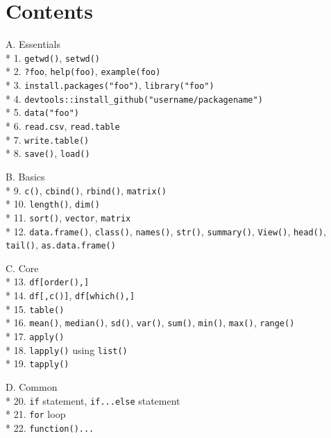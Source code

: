 \documentclass[]{book}
\begin{document}
\hypertarget{contents}{%
\section{Contents}\label{contents}}

A. Essentials\\
* 1. \texttt{getwd()}, \texttt{setwd()}\\
* 2. \texttt{?foo}, \texttt{help(foo)}, \texttt{example(foo)}\\
* 3. \texttt{install.packages("foo")}, \texttt{library("foo")}\\
* 4. \texttt{devtools::install\_github("username/packagename")}\\
* 5. \texttt{data("foo")}\\
* 6. \texttt{read.csv}, \texttt{read.table}\\
* 7. \texttt{write.table()}\\
* 8. \texttt{save()}, \texttt{load()}

B. Basics\\
* 9. \texttt{c()}, \texttt{cbind()}, \texttt{rbind()}, \texttt{matrix()}\\
* 10. \texttt{length()}, \texttt{dim()}\\
* 11. \texttt{sort()}, \texttt{\textquotesingle{}vector\textquotesingle{}{[}{]}}, \texttt{\textquotesingle{}matrix\textquotesingle{}{[}{]}}\\
* 12. \texttt{data.frame()}, \texttt{class()}, \texttt{names()}, \texttt{str()}, \texttt{summary()}, \texttt{View()}, \texttt{head()}, \texttt{tail()}, \texttt{as.data.frame()}

C. Core\\
* 13. \texttt{df{[}order(),{]}}\\
* 14. \texttt{df{[},c(){]}}, \texttt{df{[}which(),{]}}\\
* 15. \texttt{table()}\\
* 16. \texttt{mean()}, \texttt{median()}, \texttt{sd()}, \texttt{var()}, \texttt{sum()}, \texttt{min()}, \texttt{max()}, \texttt{range()}\\
* 17. \texttt{apply()}\\
* 18. \texttt{lapply()} using \texttt{list()}\\
* 19. \texttt{tapply()}

D. Common\\
* 20. \texttt{if} statement, \texttt{if...else} statement\\
* 21. \texttt{for} loop\\
* 22. \texttt{function()...}
\end{document}
